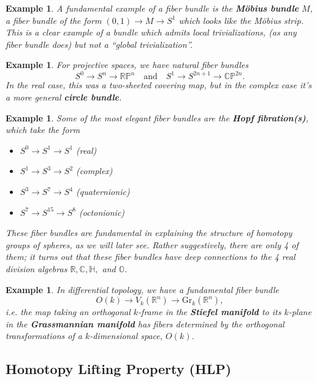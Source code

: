 \documentclass{article}
\providecommand{\R}{\mathbb{R}}
\newtheorem{example}[definition]{Example}
\begin{document}
\begin{example}
  A fundamental example of a fiber bundle is the \textbf{M\"obius bundle} $M$, a fiber bundle of the form $(0,1) \to M \to S^1$ which looks like the M\"obius strip. This is a clear example of a bundle which admits local trivializations, (as any fiber bundle does) but not a ``global trivialization''.
\end{example}

\begin{example}
  For projective spaces, we have natural fiber bundles 
  \[S^0 \to S^n \to \mathbb{RP}^n \quad\textrm{and}\quad S^1 \to S^{2n+1} \to \mathbb{CP}^{2n}.\]
  In the real case, this was a two-sheeted covering map, but in the complex case it's a more general \textbf{circle bundle}.
\end{example}

\begin{example}
  Some of the most elegant fiber bundles are the \textbf{Hopf fibration(s)}, which take the form
  \begin{itemize}
    \item $S^0 \to S^1 \to S^1$ (real)
    \item $S^1 \to S^3 \to S^2$ (complex)
    \item $S^3 \to S^7 \to S^4$ (quaternionic)
    \item $S^7 \to S^{15} \to S^8$ (octonionic)
  \end{itemize}
  These fiber bundles are fundamental in explaining the structure of homotopy groups of spheres, as we will later see. Rather suggestively, there are only 4 of them; it turns out that these fiber bundles have deep connections to the 4 real division algebras $\mathbb{R}, \mathbb{C}, \mathbb{H},$ and $\mathbb{O}$.
\end{example}

\begin{example}
  In differential topology, we have a fundamental fiber bundle 
  \[O(k) \to V_k(\R^n) \to \mathrm{Gr}_k(\R^n),\]
  i.e. the map taking an orthogonal $k$-frame in the \textbf{Stiefel manifold} to its $k$-plane in the \textbf{Grassmannian manifold} has fibers determined by the orthogonal transformations of a $k$-dimensional space, $O(k)$.
\end{example}

\subsection{Homotopy Lifting Property (HLP)}
\end{document}
